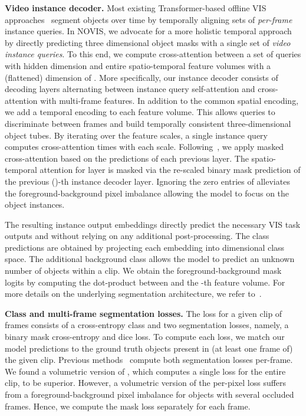 \documentclass{article}
\newcommand{\method}{\mbox{NOVIS}}
\theoremstyle{plain}
\theoremstyle{definition}
\theoremstyle{remark}
\begin{document}
\noindent \textbf{Video instance decoder.}
Most existing Transformer-based offline VIS approaches~\cite{seqformer,vistr,IFC,heo2022vita} segment objects over time by temporally aligning sets of \emph{per-frame} instance queries.
In \method{}, we advocate for a more holistic temporal approach by directly predicting three dimensional object masks with a single set of \emph{video instance queries}.
To this end, we compute cross-attention between a set of  queries  with hidden dimension  and entire spatio-temporal feature volumes with a (flattened) dimension of .
More specifically, our instance decoder consists of  decoding layers alternating between instance query self-attention and cross-attention with multi-frame features.
In addition to the common spatial encoding, we add a temporal encoding to each feature volume.
This allows queries to discriminate between frames and build temporally consistent three-dimensional object tubes.
By iterating over the  feature scales, a single instance query computes cross-attention  times with each scale.
Following~\cite{cheng2021mask2former}, we apply masked cross-attention based on the predictions of each previous layer.
The spatio-temporal attention for layer  is masked via the re-scaled binary mask prediction  of the previous ()-th instance decoder layer.
Ignoring the zero entries of  alleviates the foreground-background pixel imbalance allowing the model to focus on the object instances.

The resulting instance output embeddings  directly predict the necessary VIS task outputs  and  without relying on any additional post-processing.
The class predictions  are obtained by projecting each embedding into  dimensional class space.
The additional background class allows the model to predict an unknown number of objects within a clip.
We obtain the foreground-background mask logits by computing the dot-product between  and the -th feature volume.
For more details on the underlying segmentation architecture, we refer to~\cite{cheng2021mask2former}.

\noindent \textbf{Class and multi-frame segmentation losses.}
The loss for a given clip of frames consists of a cross-entropy class  and two segmentation losses, namely, a binary mask cross-entropy  and dice  loss.
To compute each loss, we match our model predictions to the ground truth objects present in (at least one frame of) the given clip.
Previous methods~\cite{mask2former4vis,seqformer,IFC,vistr,heo2022vita} compute both segmentation losses per-frame. 
We found a volumetric version of , which computes a single loss for the entire clip, to be superior.
However, a volumetric version of the per-pixel  loss suffers from a foreground-background pixel imbalance for objects with several occluded frames.
Hence, we compute the mask loss separately for each frame.
\end{document}
